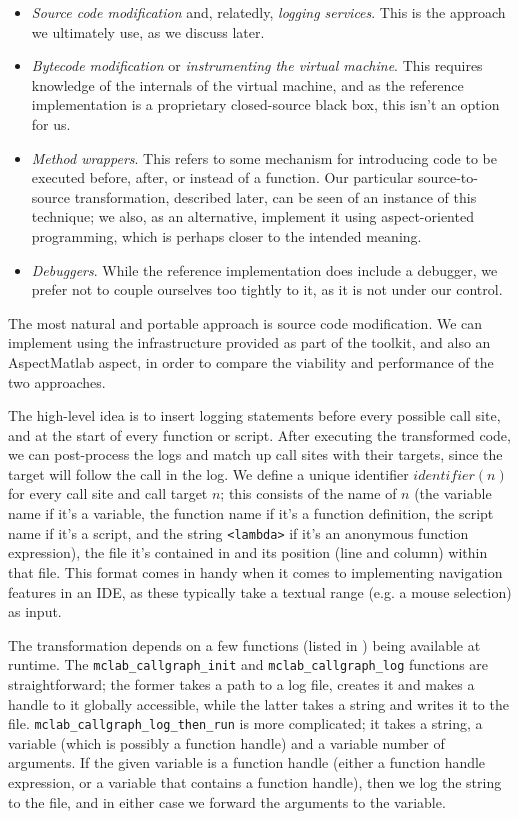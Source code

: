 \begin{itemize}
\item \emph{Source code modification} and, relatedly, \emph{logging services}.
This is the approach we ultimately use, as we discuss later.
\item \emph{Bytecode modification} or \emph{instrumenting the virtual machine}.
This requires knowledge of the internals of the \matlab virtual machine, and as
the reference \matlab implementation is a proprietary closed-source black box,
this isn't an option for us.
\item \emph{Method wrappers}. This refers to some mechanism for introducing
code to be executed before, after, or instead of a function. Our particular
source-to-source transformation, described later, can be seen of an instance of
this technique; we also, as an alternative, implement it using aspect-oriented
programming, which is perhaps closer to the intended meaning.
\item \emph{Debuggers}. While the reference \matlab implementation does include
a debugger, we prefer not to couple ourselves too tightly to it, as it is not
under our control.
\end{itemize}

The most natural and portable approach is source code modification. We can
implement using the infrastructure provided as part of the \mclab toolkit, and
also an AspectMatlab aspect, in order to compare the viability and performance
of the two approaches.

The high-level idea is to insert logging statements before every possible call
site, and at the start of every function or script. After executing the
transformed code, we can post-process the logs and match up call sites with
their targets, since the target will follow the call in the log. We define a
unique identifier $identifier(n)$ for every call site and call target $n$; this
consists of the name of $n$ (the variable name if it's a variable, the function
name if it's a function definition, the script name if it's a script, and the
string \texttt{<lambda>} if it's an anonymous function expression), the file
it's contained in and its position (line and column) within that file. This
format comes in handy when it comes to implementing navigation features in an
IDE, as these typically take a textual range (e.g. a mouse selection) as input.

The transformation depends on a few functions (listed in
) being available at runtime. The
\texttt{mclab\_callgraph\_init} and \texttt{mclab\_callgraph\_log} functions
are straightforward; the former takes a path to a log file, creates it and
makes a handle to it globally accessible, while the latter takes a string and
writes it to the file. \newline \texttt{mclab\_callgraph\_log\_then\_run} is more
complicated; it takes a string, a variable (which is possibly a function
handle) and a variable number of arguments. If the given variable is a function
handle (either a function handle expression, or a variable that contains a
function handle), then we log the string to the file, and in either case we
forward the arguments to the variable.

